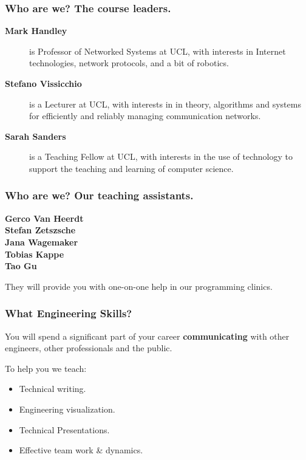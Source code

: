 \documentclass{beamer} %
\newcommand\emc[1]{\textcolor{midred}{\textbf{#1}}}
\begin{document}
\begin{frame}
\frametitle{Who are we? The course leaders.} 

\begin{description}
\item[{\bf Mark Handley}] is Professor of Networked Systems at UCL, with interests in Internet technologies, network protocols, and a bit of robotics.
\item[{\bf Stefano Vissicchio}] is a Lecturer at UCL, with interests in in theory, algorithms and systems for efficiently and reliably managing communication networks.
\item[{\bf Sarah Sanders}] is a Teaching Fellow at UCL, with interests in the use of technology to support the teaching and learning of computer science.
\end{description}

\end{frame}

\begin{frame}
\frametitle{Who are we? Our teaching assistants.} 

\begin{description}
\item[{\bf Gerco Van Heerdt}]
\item[{\bf Stefan Zetszsche}]
\item[{\bf Jana Wagemaker}]
\item[{\bf Tobias Kappe}]
\item[{\bf Tao Gu}]
\end{description}

They will provide you with one-on-one help in our programming clinics.

\end{frame}


\begin{frame}
\frametitle{What Engineering Skills?} 

You will spend a significant part of your career \emc{communicating} with other engineers, other professionals and the public.

\vspace{3mm}
To help you we teach:
\begin{itemize}
\item Technical writing.
\item Engineering visualization.
\item Technical Presentations.
\item Effective team work \& dynamics.
\end{itemize}
\end{frame}
\end{document}
